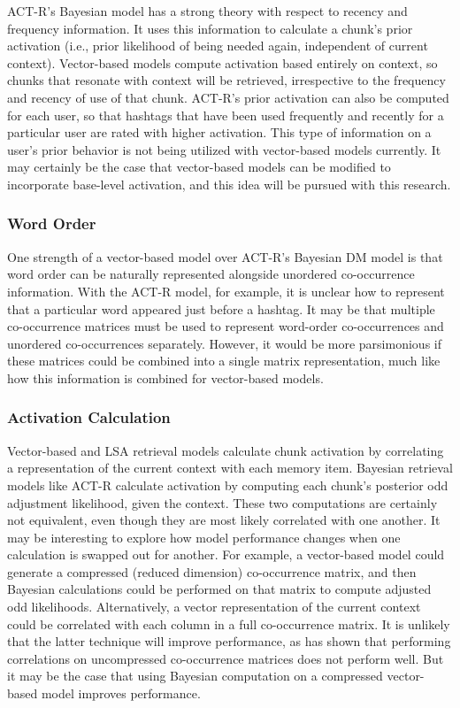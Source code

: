 \documentclass[man,floatsintext,donotrepeattitle]{apa6}
\begin{document}
ACT-R's Bayesian model has a strong theory with respect to recency and frequency information.
It uses this information to calculate a chunk's prior activation (i.e., prior likelihood of being needed again, independent of current context).
Vector-based models compute activation based entirely on context, so chunks that resonate with context will be retrieved, irrespective to the frequency and recency of use of that chunk.
ACT-R's prior activation can also be computed for each user, so that hashtags that have been used frequently and recently for a particular user are rated with higher activation.
This type of information on a user's prior behavior is not being utilized with vector-based models currently.
It may certainly be the case that vector-based models can be modified to incorporate base-level activation, and this idea will be pursued with this research.

\subsubsection{Word Order}

One strength of a vector-based model over ACT-R's Bayesian DM model is that word order can be naturally represented alongside unordered co-occurrence information.
With the ACT-R model, for example, it is unclear how to represent that a particular word appeared just before a hashtag. 
It may be that multiple co-occurrence matrices must be used to represent word-order co-occurrences and unordered co-occurrences separately.
However, it would be more parsimonious if these matrices could be combined into a single matrix representation, much like how this information is combined for vector-based models.

\subsubsection{Activation Calculation}

Vector-based and LSA retrieval models calculate chunk activation by correlating a representation of the current context with each memory item.
Bayesian retrieval models like ACT-R calculate activation by computing each chunk's posterior odd adjustment likelihood, given the context.
These two computations are certainly not equivalent, even though they are most likely correlated with one another.
It may be interesting to explore how model performance changes when one calculation is swapped out for another.
For example, a vector-based model could generate a compressed (reduced dimension) co-occurrence matrix, and then Bayesian calculations could be performed on that matrix to compute adjusted odd likelihoods.
Alternatively, a vector representation of the current context could be correlated with each column in a full co-occurrence matrix.
It is unlikely that the latter technique will improve performance, as \textcite{Landauer1997} has shown that performing correlations on uncompressed co-occurrence matrices does not perform well.
But it may be the case that using Bayesian computation on a compressed vector-based model improves performance.
\end{document}
